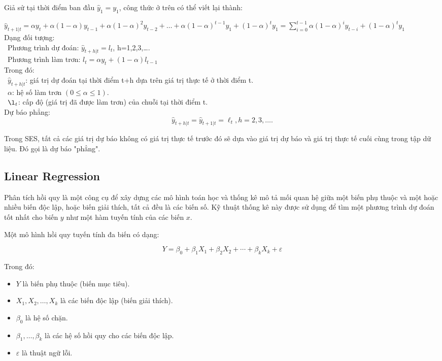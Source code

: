\documentclass[conference]{IEEEtran}
\begin{document}
Giả sử tại thời điểm ban đầu \(\hat{y}_1=y_1\), công thức ở trên có thể viết lại thành:

\({\hat{y}}_{t+1|t}=\alpha y_t+\alpha\left(1-\alpha\right)y_{t-1}+\alpha\left(1-\alpha\right)^2y_{t-2}+\ldots+\alpha\left(1-\alpha\right)^{t-1}y_1+{(1-\alpha)}^ty_1=\sum_{i=0}^{t-1}\alpha{(1-\alpha)}^iy_{t-i}+{(1-\alpha)}^ty_1\)\\

Dạng đối tượng:\\
\indent\textbullet\ Phương trình dự đoán: \(\hat{y}_{t+h|t}=l_t\), h=1,2,3,\dots.\\
\indent\textbullet\ Phương trình làm trơn: \(l_t=\alpha y_t+(1-\alpha)l_{t-1}\)\\

Trong đó:\\
\indent\textbullet\ \(\hat{y}_{t+h|t} \): giá trị dự đoán tại thời điểm t+h dựa trên giá trị thực tế ở thời điểm t.\\
\indent\textbullet\ \(\alpha\): hệ số làm trơn \((0\le\alpha\le1)\).\\
\indent\textbullet\ \(\l_t \): cấp độ (giá trị đã được làm trơn) của chuỗi tại thời điểm t.\\

Dự báo phẳng:
\[\hat{y}_{t+h|t} = \hat{y}_{t+1|t}=\ell_t, h=2,3,\dots.\]

Trong SES, tất cả các giá trị dự báo không có giá trị thực tế trước đó sẽ dựa vào giá trị dự báo và giá trị thực tế cuối cùng trong tập dữ liệu. Đó gọi là dự báo "phẳng".
\subsection{Linear Regression}
Phân tích hồi quy là một công cụ để xây dựng các mô hình toán học và thống kê mô tả mối quan hệ giữa một biến phụ thuộc và một hoặc nhiều biến độc lập, hoặc biến giải thích, tất cả đều là các biến số. Kỹ thuật thống kê này được sử dụng để tìm một phương trình dự đoán tốt nhất cho biến \( y \) như một hàm tuyến tính của các biến \( x \).

Một mô hình hồi quy tuyến tính đa biến có dạng:

\[ Y = \beta_0 + \beta_1X_1 + \beta_2X_2 + \cdots + \beta_kX_k + \varepsilon \]

Trong đó:
\begin{itemize}
    \item \( Y \) là biến phụ thuộc (biến mục tiêu).
    \item \( X_1, X_2, \ldots, X_k \) là các biến độc lập (biến giải thích).
    \item \( \beta_0 \) là hệ số chặn.
    \item \( \beta_1, \ldots, \beta_k \) là các hệ số hồi quy cho các biến độc lập.
    \item \( \varepsilon \) là thuật ngữ lỗi.
\end{itemize}
\end{document}
